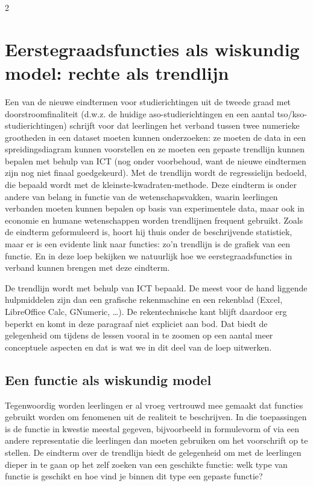 \begin{multicols}{2}
\section{Eerstegraadsfuncties als wiskundig model: rechte als trendlijn}
Een van de nieuwe eindtermen voor studierichtingen uit de tweede graad met doorstroomfinaliteit (d.w.z. de huidige aso-studierichtingen en een aantal tso/kso-studierichtingen) schrijft voor dat leerlingen het verband tussen twee numerieke grootheden in een dataset moeten kunnen onderzoeken: ze moeten de data in een spreidings\-diagram kunnen voorstellen en ze moeten een gepaste trendlijn kunnen bepalen met behulp van ICT (nog onder voorbehoud, want de nieuwe eindtermen zijn nog niet finaal goedgekeurd). Met de trendlijn wordt de regressielijn bedoeld, die bepaald wordt met de kleinste-kwadraten-methode. Deze eindterm is onder andere van belang in functie van de wetenschapsvakken, waarin leerlingen verbanden moeten kunnen bepalen op basis van experimentele data, maar ook in economie en humane wetenschappen worden trendlijnen frequent gebruikt. Zoals de eindterm geformuleerd is, hoort hij thuis onder de beschrijvende statistiek, maar er is een evidente link naar functies: zo’n trendlijn is de grafiek van een functie. En in deze loep bekijken we natuurlijk hoe we eerstegraadsfuncties in verband kunnen brengen met deze eindterm.

De trendlijn wordt met behulp van ICT bepaald. De meest voor de hand liggende hulpmiddelen zijn dan een grafische rekenmachine en een rekenblad (Excel, LibreOffice Calc, GNumeric, …). De rekentechnische kant blijft daardoor erg beperkt en komt in deze paragraaf niet expliciet aan bod. Dat biedt de gelegenheid om tijdens de lessen vooral in te zoomen op een aantal meer conceptuele aspecten en dat is wat we in dit deel van de loep uitwerken.

\subsection{Een functie als wiskundig model}
Tegenwoordig worden leerlingen er al vroeg vertrouwd mee gemaakt dat functies gebruikt worden om fenomenen uit de realiteit te beschrijven. In die toepassingen is de functie in kwestie meestal gegeven, bijvoorbeeld in formulevorm of via een andere representatie die leerlingen dan moeten gebruiken om het voorschrift op te stellen. De eindterm over de trendlijn biedt de gelegenheid om met de leerlingen dieper in te gaan op het zelf zoeken van een geschikte functie: welk type van functie is geschikt en hoe vind je binnen dit type een gepaste functie?


\end{multicols}
